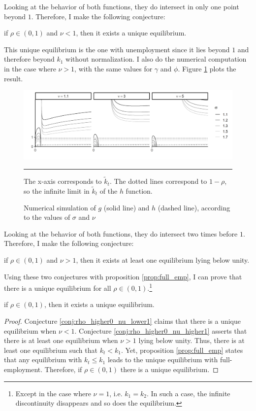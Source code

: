 Looking at the behavior of both functions, they do intersect in only one point beyond $1$. Therefore, I make the following conjecture:
	\begin{conjecture}\label{conj:rho_higher0_nu_lower1}
		if $\rho \in (0,1)$ and $\nu < 1$, then it exists a unique equilibrium.
	\end{conjecture}
This unique equilibrium is the one with unemployment since it lies beyond $1$ and therefore beyond $k_1$ without normalization. I also do the numerical computation in the case where $\nu > 1$, with the same values for $\gamma$ and $\phi$. Figure \ref{fig:gh1} plots the result.
	\begin{figure}[tb]
		\centering
		\includegraphics[width = 1\linewidth]{../result/appendix_A/uniqueness/gc_all.png}
		\caption{Numerical simulation of $g$ (solid line) and $h$ (dashed line), according to the values of $\sigma$ and $\nu$}
		\label{fig:gh1}
		\vspace{.5ex}
		\hrule
		\vspace{-4ex}
		\justify\singlespacing\footnotesize The x-axis corresponds to $\tilde{k}_t$. The dotted lines correspond to $1-\rho$, so the infinite limit in $\tilde{k}_t$ of the $h$ function.
	\end{figure}
Looking at the behavior of both functions, they do intersect two times before $1$. Therefore, I make the following conjecture:
	\begin{conjecture}\label{conj:rho_higher0_nu_higher1}
		if $\rho \in (0,1)$ and $\nu > 1$, then it exists at least one equilibrium lying below unity.
	\end{conjecture}
Using these two conjectures with proposition \ref{prop:full_emp}, I can prove that there is a unique equilibrium for all $\rho \in (0,1)$.\footnote{Except in the case where $\nu = 1$, i.e. $k_1 = k_2$. In such a case, the infinite discontinuity disappears and so does the equilibrium.}
	\begin{proposition}
		if $\rho \in (0,1)$, then it exists a unique equilibrium.
	\end{proposition}
	\begin{proof}
		Conjecture \ref{conj:rho_higher0_nu_lower1} claims that there is a unique equilibrium when $\nu < 1$. Conjecture \ref{conj:rho_higher0_nu_higher1} asserts that there is at least one equilibrium when $\nu > 1$ lying below unity. Thus, there is at least one equilibrium such that $k_t < k_1$. Yet, proposition \ref{prop:full_emp} states that any equilibrium with $k_t \leq k_1$ leads to the unique equilibrium with full-employment. Therefore, if $\rho \in (0,1)$ there is a unique equilibrium.
	\end{proof}



